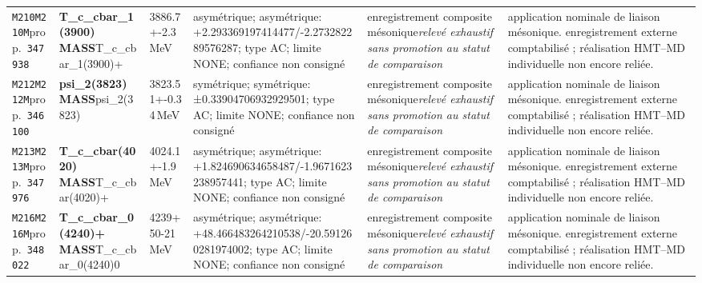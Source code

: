 \begin{landscape}
\begin{longtable}{L{1.85cm}L{4.45cm}L{2.35cm}L{4.05cm}L{3.35cm}L{7.15cm}}
\texttt{M210}\newline \texttt{M210M}\newline prop.\ \texttt{347938} & \textbf{T\_\allowbreak{}c\_\allowbreak{}cbar\_\allowbreak{}1(3900) MASS}\newline T\_\allowbreak{}c\_\allowbreak{}cbar\_\allowbreak{}1(3900)+ & 3886.7+-2.3\,MeV & asymétrique; asymétrique: +2.293369197414477/-2.273282289576287; type AC; limite NONE; confiance non consigné & enregistrement composite mésonique\newline \emph{relevé exhaustif sans promotion au statut de comparaison} & application nominale de liaison mésonique. enregistrement externe comptabilisé ; réalisation HMT--MD individuelle non encore reliée. \\
\texttt{M212}\newline \texttt{M212M}\newline prop.\ \texttt{346100} & \textbf{psi\_\allowbreak{}2(3823) MASS}\newline psi\_\allowbreak{}2(3823) & 3823.51+-0.34\,MeV & symétrique; symétrique: ±0.33904706932929501; type AC; limite NONE; confiance non consigné & enregistrement composite mésonique\newline \emph{relevé exhaustif sans promotion au statut de comparaison} & application nominale de liaison mésonique. enregistrement externe comptabilisé ; réalisation HMT--MD individuelle non encore reliée. \\
\texttt{M213}\newline \texttt{M213M}\newline prop.\ \texttt{347976} & \textbf{T\_\allowbreak{}c\_\allowbreak{}cbar(4020) MASS}\newline T\_\allowbreak{}c\_\allowbreak{}cbar(4020)+ & 4024.1+-1.9\,MeV & asymétrique; asymétrique: +1.824690634658487/-1.9671623238957441; type AC; limite NONE; confiance non consigné & enregistrement composite mésonique\newline \emph{relevé exhaustif sans promotion au statut de comparaison} & application nominale de liaison mésonique. enregistrement externe comptabilisé ; réalisation HMT--MD individuelle non encore reliée. \\
\texttt{M216}\newline \texttt{M216M}\newline prop.\ \texttt{348022} & \textbf{T\_\allowbreak{}c\_\allowbreak{}cbar\_\allowbreak{}0(4240)+ MASS}\newline T\_\allowbreak{}c\_\allowbreak{}cbar\_\allowbreak{}0(4240)0 & 4239+50-21\,MeV & asymétrique; asymétrique: +48.466483264210538/-20.591260281974002; type AC; limite NONE; confiance non consigné & enregistrement composite mésonique\newline \emph{relevé exhaustif sans promotion au statut de comparaison} & application nominale de liaison mésonique. enregistrement externe comptabilisé ; réalisation HMT--MD individuelle non encore reliée. \\

\end{longtable}
\end{landscape}
